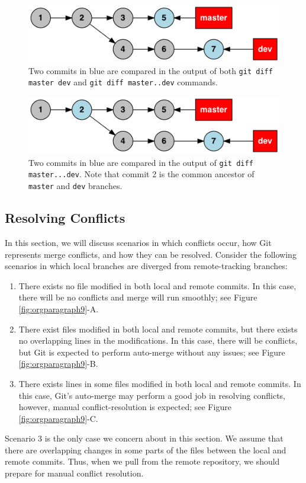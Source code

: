 \documentclass[11pt]{article}
\begin{document}
\begin{figure}[htb]
\centering
\includegraphics[width=.9\linewidth]{./images/diff-AB.png}
\caption{\label{fig:orgparagraph7}
Two commits in blue are compared in the output of both \texttt{git diff master dev} and \texttt{git diff master..dev} commands.}
\end{figure}
\begin{figure}[htb]
\centering
\includegraphics[width=.9\linewidth]{./images/diff-A___B.png}
\caption{\label{fig:orgparagraph8}
Two commits in blue are compared in the output of \texttt{git diff master...dev}. Note that commit 2 is the common ancestor of \texttt{master} and \texttt{dev} branches.}
\end{figure}

\subsection{\label{orgtarget8} Resolving Conflicts}
\label{sec:orgheadline19}
In this section, we will discuss scenarios in which conflicts occur, how Git represents merge conflicts, and how they can be resolved. Consider the following scenarios in which local branches are diverged from remote-tracking branches:
\begin{enumerate}
\item There exists no file modified in both local and remote commits. In this case, there will be no conflicts and merge will run smoothly; see Figure \ref{fig:orgparagraph9}-A.
\item There exist files modified in both local and remote commits, but there exists no overlapping lines in the modifications. In this case, there will be conflicts, but Git is expected to perform auto-merge without any issues; see Figure \ref{fig:orgparagraph9}-B.
\item There exists lines in some files modified in both local and remote commits. In this case, Git's auto-merge may perform a good job in resolving conflicts, however, manual conflict-resolution is expected; see Figure \ref{fig:orgparagraph9}-C.
\end{enumerate}
Scenario 3 is the only case we concern about in this section. We assume that there are overlapping changes in some parts of the files between the local and remote commits. Thus, when we pull from the remote repository, we should prepare for manual conflict resolution.
\end{document}
